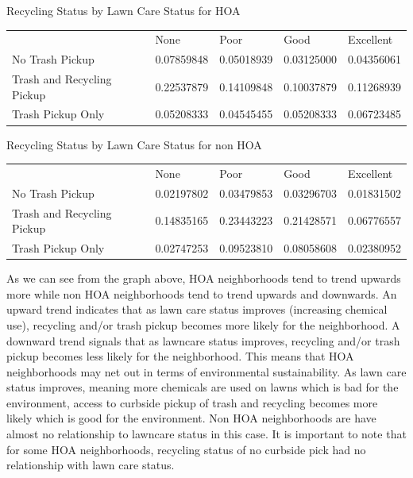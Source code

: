 \documentclass{article}
\begin{document}
\begin{center} Recycling Status by Lawn Care Status for HOA \end{center}
\begin{table}[H]
\begin{tabular}{lllll}
                           & None       & Poor       & Good       & Excellent  \\
No Trash Pickup            & 0.07859848 & 0.05018939 & 0.03125000 & 0.04356061 \\
Trash and Recycling Pickup & 0.22537879 & 0.14109848 & 0.10037879 & 0.11268939 \\
Trash Pickup Only          & 0.05208333 & 0.04545455 & 0.05208333 & 0.06723485
\end{tabular}
\end{table}

\begin{center} Recycling Status by Lawn Care Status for non HOA \end{center}
\begin{table}[H]
\begin{tabular}{lllll}
                           & None       & Poor       & Good       & Excellent  \\
No Trash Pickup            & 0.02197802 & 0.03479853 & 0.03296703 & 0.01831502 \\
Trash and Recycling Pickup & 0.14835165 & 0.23443223 & 0.21428571 & 0.06776557 \\
Trash Pickup Only          & 0.02747253 & 0.09523810 & 0.08058608 & 0.02380952
\end{tabular}
\end{table}

As we can see from the graph above, HOA neighborhoods tend to trend upwards more while non HOA neighborhoods tend to trend upwards and downwards. An upward trend indicates that as lawn care status improves (increasing chemical use), recycling and/or trash pickup becomes more likely for the neighborhood. A downward trend signals that as lawncare status improves, recycling and/or trash pickup becomes less likely for the neighborhood. This means that HOA neighborhoods may net out in terms of environmental sustainability. As lawn care status improves, meaning more chemicals are used on lawns which is bad for the environment, access to curbside pickup of trash and recycling becomes more likely which is good for the environment. Non HOA neighborhoods are have almost no relationship to lawncare status in this case. It is important to note that for some HOA neighborhoods, recycling status of no curbside pick had no relationship with lawn care status.
\end{document}
